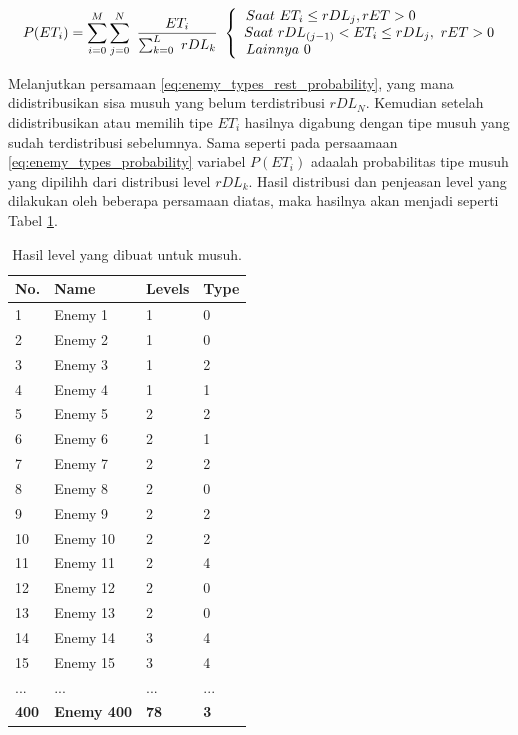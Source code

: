 \begin{equation}\label{eq:enemy_types_rest_probability}
	P(ET_{i}) = \sum_{i = 0}^{M} \sum_{j = 0}^{N}\ \frac{ET_{i}}{\sum_{k = 0}^{L}\ rDL_{k}}\
	\left\{\begin{matrix}
	\hspace{-5.0em} Saat\ ET_{i} \leq rDL_{j}, rET > 0\\
	\hspace{0.5em} Saat\ rDL_{(j-1)} < ET_{i} \leq rDL_{j},\ rET > 0\\
	\hspace{-12.5em} Lainnya\ 0
	\end{matrix}\right.
\end{equation}

Melanjutkan persamaan \ref{eq:enemy_types_rest_probability}, yang mana didistribusikan sisa musuh yang belum terdistribusi $rDL_{N}$. Kemudian setelah didistribusikan atau memilih tipe $ET_{i}$ hasilnya digabung dengan tipe musuh yang sudah terdistribusi sebelumnya. Sama seperti pada persaamaan \ref{eq:enemy_types_probability} variabel $P(ET_{i})$ adaalah probabilitas tipe musuh yang dipilihh dari distribusi level $rDL_{k}$. Hasil distribusi dan penjeasan level yang dilakukan oleh beberapa persamaan diatas, maka hasilnya akan menjadi seperti Tabel \ref{tb:enemy_type_distrib}.
\vspace{1ex}

\begin{table}[!h]
	\centering
	\caption{Hasil level yang dibuat untuk musuh.}
	\vspace{-2ex}
	\label{tb:enemy_type_distrib}
	\begin{tabular}{|l|l|l|l|}
		\hline
		\textbf{No.} & \textbf{Name} & \textbf{Levels} & \textbf{Type} \\ \hline
		1 & Enemy 1 & 1 & 0 \\ \hline
		2 & Enemy 2 & 1 & 0 \\ \hline
		3 & Enemy 3 & 1 & 2 \\ \hline
		4 & Enemy 4 & 1 & 1 \\ \hline
		5 & Enemy 5 & 2 & 2 \\ \hline
		6 & Enemy 6 & 2 & 1 \\ \hline
		7 & Enemy 7 & 2 & 2 \\ \hline
		8 & Enemy 8 & 2 & 0 \\ \hline
		9 & Enemy 9 & 2 & 2 \\ \hline
		10 & Enemy 10 & 2 & 2 \\ \hline
		11 & Enemy 11 & 2 & 4 \\ \hline
		12 & Enemy 12 & 2 & 0 \\ \hline
		13 & Enemy 13 & 2 & 0 \\ \hline
		14 & Enemy 14 & 3 & 4 \\ \hline
		15 & Enemy 15 & 3 & 4 \\ \hline
		... & ... & ... & ... \\ \hline
		\textbf{400} & \textbf{Enemy 400} & \textbf{78} & \textbf{3} \\ \hline
	\end{tabular}
\end{table}
\vspace{1ex}

